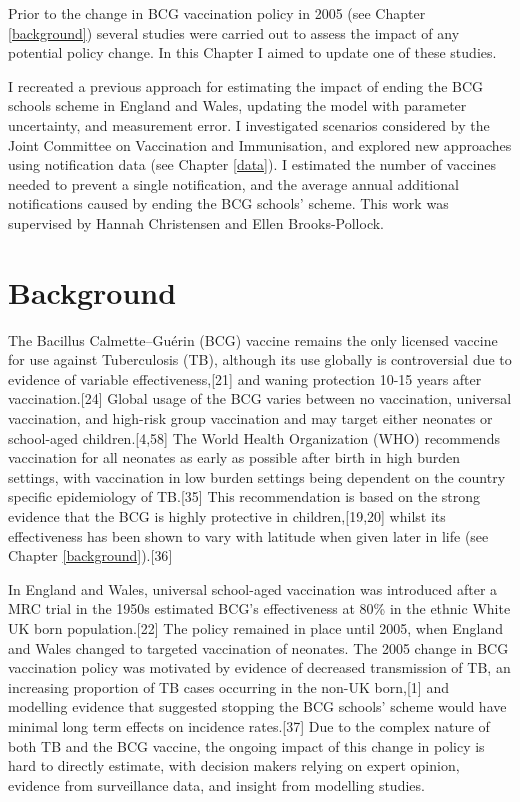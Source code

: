 \documentclass[11pt,twoside]{bristolthesis}
\begin{document}
  Prior to the change in BCG vaccination policy in 2005 (see Chapter \ref{background}) several studies were carried out to assess the impact of any potential policy change. In this Chapter I aimed to update one of these studies.
  
  I recreated a previous approach for estimating the impact of ending the BCG schools scheme in England and Wales, updating the model with parameter uncertainty, and measurement error. I investigated scenarios considered by the Joint Committee on Vaccination and Immunisation, and explored new approaches using notification data (see Chapter \ref{data}). I estimated the number of vaccines needed to prevent a single notification, and the average annual additional notifications caused by ending the BCG schools' scheme. This work was supervised by Hannah Christensen and Ellen Brooks-Pollock.
  
  \hypertarget{background-3}{%
  \section{Background}\label{background-3}}
  
  The Bacillus Calmette--Guérin (BCG) vaccine remains the only licensed vaccine for use against Tuberculosis (TB), although its use globally is controversial due to evidence of variable effectiveness,{[}21{]} and waning protection 10-15 years after vaccination.{[}24{]} Global usage of the BCG varies between no vaccination, universal vaccination, and high-risk group vaccination and may target either neonates or school-aged children.{[}4,58{]} The World Health Organization (WHO) recommends vaccination for all neonates as early as possible after birth in high burden settings, with vaccination in low burden settings being dependent on the country specific epidemiology of TB.{[}35{]} This recommendation is based on the strong evidence that the BCG is highly protective in children,{[}19,20{]} whilst its effectiveness has been shown to vary with latitude when given later in life (see Chapter \ref{background}).{[}36{]}
  
  In England and Wales, universal school-aged vaccination was introduced after a MRC trial in the 1950s estimated BCG's effectiveness at 80\% in the ethnic White UK born population.{[}22{]} The policy remained in place until 2005, when England and Wales changed to targeted vaccination of neonates. The 2005 change in BCG vaccination policy was motivated by evidence of decreased transmission of TB, an increasing proportion of TB cases occurring in the non-UK born,{[}1{]} and modelling evidence that suggested stopping the BCG schools' scheme would have minimal long term effects on incidence rates.{[}37{]} Due to the complex nature of both TB and the BCG vaccine, the ongoing impact of this change in policy is hard to directly estimate, with decision makers relying on expert opinion, evidence from surveillance data, and insight from modelling studies.
  
\end{document}

